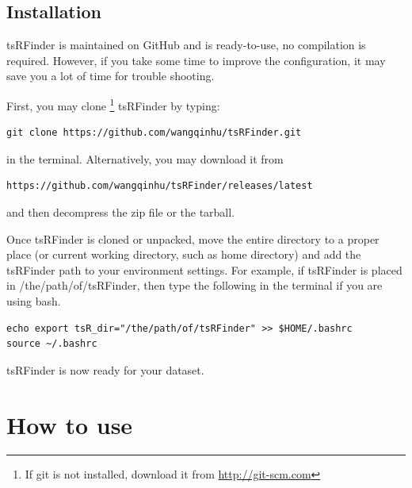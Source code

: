 \documentclass[11pt, a4paper]{article}
\begin{document}
\subsection{Installation}

tsRFinder is maintained on GitHub and is ready-to-use, no compilation is required. However, if you take some time to improve the configuration, it may save you a lot of time for trouble shooting.

First, you may clone \footnote{If git is not installed, download it from \url{http://git-scm.com}} tsRFinder by typing:

{\footnotesize \begin{tcolorbox}[colback=blue!5!white,colframe=blue!75!black,title=Clone tsRFinder]
\begin{verbatim}
git clone https://github.com/wangqinhu/tsRFinder.git
\end{verbatim}
\end{tcolorbox}}

in the terminal. Alternatively, you may download it from

{\footnotesize \begin{tcolorbox}[colback=blue!5!white,colframe=blue!75!black,title=Latest release of tsRFinder]
\begin{verbatim}
https://github.com/wangqinhu/tsRFinder/releases/latest
\end{verbatim}
\end{tcolorbox}}

and then decompress the zip file or the tarball.

Once tsRFinder is cloned or unpacked, move the entire directory to a proper place (or current working directory, such as home directory) and add the tsRFinder path to your environment settings. For example, if tsRFinder is placed in /the/path/of/tsRFinder, then type the following in the terminal if you are using bash.


{\footnotesize \begin{tcolorbox}[colback=blue!5!white,colframe=blue!75!black,title=Setup tsRFinder]
\begin{verbatim}
echo export tsR_dir="/the/path/of/tsRFinder" >> $HOME/.bashrc
source ~/.bashrc
\end{verbatim}
\end{tcolorbox}}

tsRFinder is now ready for your dataset.

\section{How to use}
\end{document}

